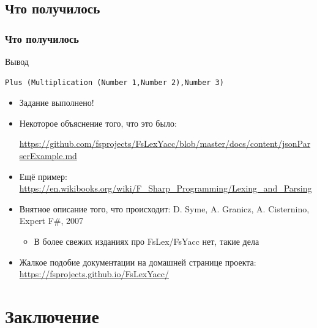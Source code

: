 \documentclass[xetex,mathserif,serif]{beamer}
\begin{document}
    \subsection{Что получилось}

    \begin{frame}[fragile]
        \frametitle{Что получилось}
        \begin{exampleblock}{Вывод}
            \begin{verbatim}
Plus (Multiplication (Number 1,Number 2),Number 3)
            \end{verbatim}
        \end{exampleblock}
        \begin{itemize}
            \item Задание выполнено!
            \item Некоторое объяснение того, что это было:
            
                \url{https://github.com/fsprojects/FsLexYacc/blob/master/docs/content/jsonParserExample.md}
            \item Ещё пример: \url{https://en.wikibooks.org/wiki/F_Sharp_Programming/Lexing_and_Parsing}
            \item Внятное описание того, что происходит: D. Syme, A. Granicz, A. Cisternino, Expert F\#, 2007
            \begin{itemize}
                \item В более свежих изданиях про FsLex/FsYacc нет, такие дела
            \end{itemize}
            \item Жалкое подобие документации на домашней странице проекта: \url{https://fsprojects.github.io/FsLexYacc/}
        \end{itemize}
    \end{frame}

    \section{Заключение}
\end{document}
